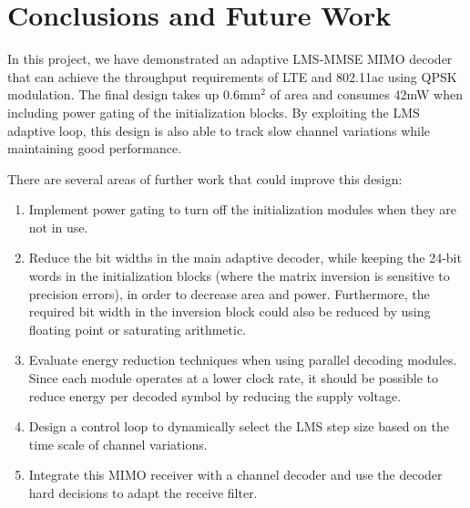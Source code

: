 \documentclass[journal]{IEEEtran}
\begin{document}
\section{Conclusions and Future Work}

In this project, we have demonstrated an adaptive LMS-MMSE MIMO decoder that can achieve the throughput requirements of LTE and 802.11ac using QPSK modulation. The final design takes up 0.6mm$^2$ of area and consumes 42mW when including power gating of the initialization blocks. By exploiting the LMS adaptive loop, this design is also able to track slow channel variations while maintaining good performance.

There are several areas of further work that could improve this design:
\begin{enumerate}
\item Implement power gating to turn off the initialization modules when they are not in use.
\item Reduce the bit widths in the main adaptive decoder, while keeping the 24-bit words in the initialization blocks (where the matrix inversion is sensitive to precision errors), in order to decrease area and power. Furthermore, the required bit width in the inversion block could also be reduced by using floating point or saturating arithmetic.
\item Evaluate energy reduction techniques when using parallel decoding modules. Since each module operates at a lower clock rate, it should be possible to reduce energy per decoded symbol by reducing the supply voltage.
\item Design a control loop to dynamically select the LMS step size based on the time scale of channel variations.
\item Integrate this MIMO receiver with a channel decoder and use the decoder hard decisions to adapt the receive filter.
\end{enumerate}





\end{document}
